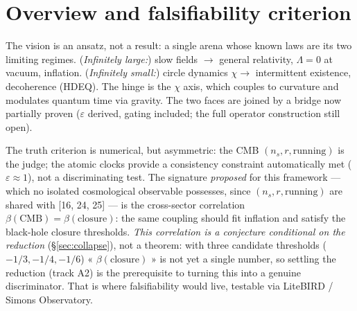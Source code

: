 \documentclass[11pt,a4paper]{article}
\theoremstyle{definition}
\begin{document}
\section{Overview and falsifiability criterion}
The vision is an ansatz, not a result: a single arena whose known laws are its two limiting
regimes. (\emph{Infinitely large:}) slow fields $\to$ general relativity, $\Lambda=0$ at
vacuum, inflation. (\emph{Infinitely small:}) circle dynamics $\chi\to$ intermittent
existence, decoherence (HDEQ). The hinge is the $\chi$ axis, which couples to curvature and
modulates quantum time via gravity. The two faces are joined by a bridge now partially proven
($\varepsilon$ derived, gating included; the full operator construction still open).

The truth criterion is numerical, but asymmetric: the CMB $(n_s,r,\text{running})$ is the
judge; the atomic clocks provide a consistency constraint automatically met ($\varepsilon\approx1$),
not a discriminating test. The signature \emph{proposed} for this framework --- which no
isolated cosmological observable possesses, since $(n_s,r,\text{running})$ are shared with
[16, 24, 25] --- is the cross-sector correlation $\beta(\mathrm{CMB})=\beta(\text{closure})$:
the same coupling should fit inflation and satisfy the black-hole closure thresholds.
\emph{This correlation is a conjecture conditional on the reduction} (\S\ref{sec:collapse}),
not a theorem: with three candidate thresholds ($-1/3,-1/4,-1/6$) « $\beta(\text{closure})$ »
is not yet a single number, so settling the reduction (track A2) is the prerequisite to
turning this into a genuine discriminator. That is where falsifiability would live, testable
via LiteBIRD / Simons Observatory.

\end{document}
